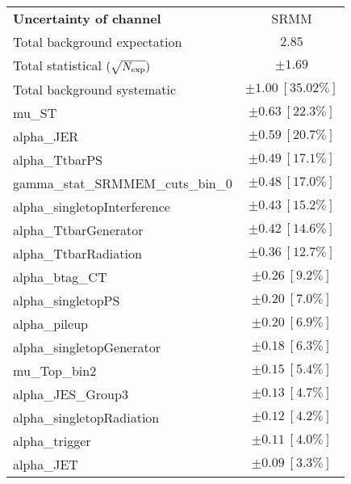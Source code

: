 
\begin{table}
\begin{center}
\setlength{\tabcolsep}{0.0pc}
\begin{tabular*}{\textwidth}{@{\extracolsep{\fill}}lc}
\noalign{\smallskip}\hline\noalign{\smallskip}
{\bf Uncertainty of channel}                                    & SRMM            \\
\noalign{\smallskip}\hline\noalign{\smallskip}
Total background expectation             &  $2.85$       \\
\noalign{\smallskip}\hline\noalign{\smallskip}
Total statistical $(\sqrt{N_{\rm exp}})$              & $\pm 1.69$       \\
Total background systematic               & $\pm 1.00\ [35.02\%] $             \\
\noalign{\smallskip}\hline\noalign{\smallskip}
\noalign{\smallskip}\hline\noalign{\smallskip}
mu\_ST         & $\pm 0.63\ [22.3\%] $       \\
alpha\_JER         & $\pm 0.59\ [20.7\%] $       \\
alpha\_TtbarPS         & $\pm 0.49\ [17.1\%] $       \\
gamma\_stat\_SRMMEM\_cuts\_bin\_0         & $\pm 0.48\ [17.0\%] $       \\
alpha\_singletopInterference         & $\pm 0.43\ [15.2\%] $       \\
alpha\_TtbarGenerator         & $\pm 0.42\ [14.6\%] $       \\
alpha\_TtbarRadiation         & $\pm 0.36\ [12.7\%] $       \\
alpha\_btag\_CT         & $\pm 0.26\ [9.2\%] $       \\
alpha\_singletopPS         & $\pm 0.20\ [7.0\%] $       \\
alpha\_pileup         & $\pm 0.20\ [6.9\%] $       \\
alpha\_singletopGenerator         & $\pm 0.18\ [6.3\%] $       \\
mu\_Top\_bin2         & $\pm 0.15\ [5.4\%] $       \\
alpha\_JES\_Group3         & $\pm 0.13\ [4.7\%] $       \\
alpha\_singletopRadiation         & $\pm 0.12\ [4.2\%] $       \\
alpha\_trigger         & $\pm 0.11\ [4.0\%] $       \\
alpha\_JET         & $\pm 0.09\ [3.3\%] $       \\

\end{tabular*}
\end{center}
\end{table}
